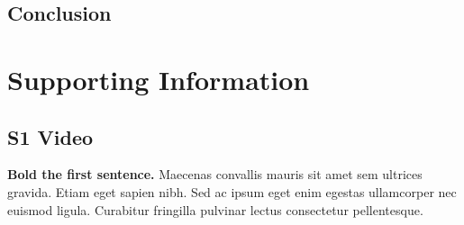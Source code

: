 \documentclass[10pt,letterpaper]{article}
\begin{document}



\subsection*{Conclusion}





\section*{Supporting Information}

\subsection*{S1 Video}
\label{S1_Video}
{\bf Bold the first sentence.}  Maecenas convallis mauris sit amet sem ultrices gravida. Etiam eget sapien nibh. Sed ac ipsum eget enim egestas ullamcorper nec euismod ligula. Curabitur fringilla pulvinar lectus consectetur pellentesque.
\end{document}
